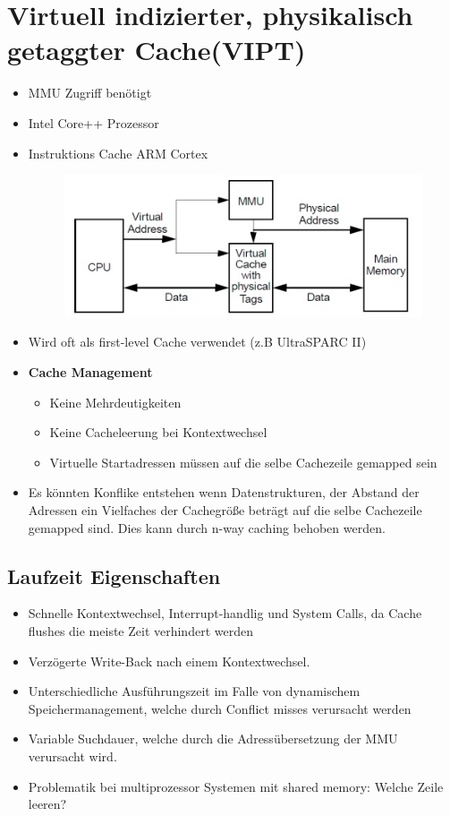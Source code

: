 \documentclass[a4paper]{scrreprt}
\begin{document}
\section{Virtuell indizierter, physikalisch getaggter Cache(VIPT)}
\begin{itemize}
\item MMU Zugriff benötigt
\item Intel Core++ Prozessor
\item Instruktions Cache ARM Cortex

\begin{figure}[ht]
\centering
\includegraphics[scale=0.5]{graphics/VIPT.png}
\end{figure}

\item Wird oft als first-level Cache verwendet (z.B UltraSPARC II)
\item \textbf{Cache Management}
\begin{itemize}
\item Keine Mehrdeutigkeiten
\item Keine Cacheleerung bei Kontextwechsel
\item Virtuelle Startadressen müssen auf die selbe Cachezeile gemapped sein
\end{itemize}

\item Es könnten Konflike entstehen wenn Datenstrukturen, der Abstand der Adressen ein Vielfaches der Cachegröße beträgt auf die selbe Cachezeile gemapped sind. Dies kann durch n-way caching behoben werden.
\end{itemize}
\subsection{Laufzeit Eigenschaften}
\begin{itemize}
\item Schnelle Kontextwechsel, Interrupt-handlig und System Calls, da Cache flushes die meiste Zeit verhindert werden
\item Verzögerte Write-Back nach einem Kontextwechsel. 
\item Unterschiedliche Ausführungszeit im Falle von dynamischem Speichermanagement, welche durch Conflict misses verursacht werden
\item  Variable Suchdauer, welche durch die Adressübersetzung der MMU verursacht wird.
\item Problematik bei multiprozessor Systemen mit shared memory: Welche Zeile leeren?
\end{itemize}
\end{document}
